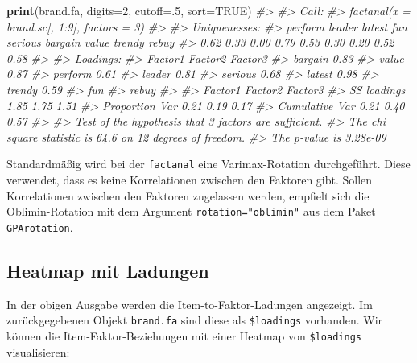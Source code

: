 \documentclass[12pt,]{book}
\newenvironment{Shaded}{\begin{snugshade}}{\end{snugshade}}
\newcommand{\KeywordTok}[1]{\textcolor[rgb]{0.13,0.29,0.53}{\textbf{{#1}}}}
\newcommand{\DataTypeTok}[1]{\textcolor[rgb]{0.13,0.29,0.53}{{#1}}}
\newcommand{\DecValTok}[1]{\textcolor[rgb]{0.00,0.00,0.81}{{#1}}}
\newcommand{\CommentTok}[1]{\textcolor[rgb]{0.56,0.35,0.01}{\textit{{#1}}}}
\newcommand{\OtherTok}[1]{\textcolor[rgb]{0.56,0.35,0.01}{{#1}}}
\newcommand{\NormalTok}[1]{{#1}}
\begin{document}
\begin{Shaded}
\begin{Highlighting}[]
\KeywordTok{print}\NormalTok{(brand.fa, }\DataTypeTok{digits=}\DecValTok{2}\NormalTok{, }\DataTypeTok{cutoff=}\NormalTok{.}\DecValTok{5}\NormalTok{, }\DataTypeTok{sort=}\OtherTok{TRUE}\NormalTok{)}
\CommentTok{#> }
\CommentTok{#> Call:}
\CommentTok{#> factanal(x = brand.sc[, 1:9], factors = 3)}
\CommentTok{#> }
\CommentTok{#> Uniquenesses:}
\CommentTok{#> perform  leader  latest     fun serious bargain   value  trendy   rebuy }
\CommentTok{#>    0.62    0.33    0.00    0.79    0.53    0.30    0.20    0.52    0.58 }
\CommentTok{#> }
\CommentTok{#> Loadings:}
\CommentTok{#>         Factor1 Factor2 Factor3}
\CommentTok{#> bargain  0.83                  }
\CommentTok{#> value    0.87                  }
\CommentTok{#> perform          0.61          }
\CommentTok{#> leader           0.81          }
\CommentTok{#> serious          0.68          }
\CommentTok{#> latest                   0.98  }
\CommentTok{#> trendy                   0.59  }
\CommentTok{#> fun                            }
\CommentTok{#> rebuy                          }
\CommentTok{#> }
\CommentTok{#>                Factor1 Factor2 Factor3}
\CommentTok{#> SS loadings       1.85    1.75    1.51}
\CommentTok{#> Proportion Var    0.21    0.19    0.17}
\CommentTok{#> Cumulative Var    0.21    0.40    0.57}
\CommentTok{#> }
\CommentTok{#> Test of the hypothesis that 3 factors are sufficient.}
\CommentTok{#> The chi square statistic is 64.6 on 12 degrees of freedom.}
\CommentTok{#> The p-value is 3.28e-09}
\end{Highlighting}
\end{Shaded}

Standardmäßig wird bei der \texttt{factanal} eine Varimax-Rotation
durchgeführt. Diese verwendet, dass es keine Korrelationen zwischen den
Faktoren gibt. Sollen Korrelationen zwischen den Faktoren zugelassen
werden, empfielt sich die Oblimin-Rotation mit dem Argument
\texttt{rotation="oblimin"} aus dem Paket \texttt{GPArotation}.

\subsection{Heatmap mit Ladungen}\label{heatmap-mit-ladungen}

In der obigen Ausgabe werden die Item-to-Faktor-Ladungen angezeigt. Im
zurückgegebenen Objekt \texttt{brand.fa} sind diese als
\texttt{\$loadings} vorhanden. Wir können die Item-Faktor-Beziehungen
mit einer Heatmap von \texttt{\$loadings} visualisieren:
\end{document}
